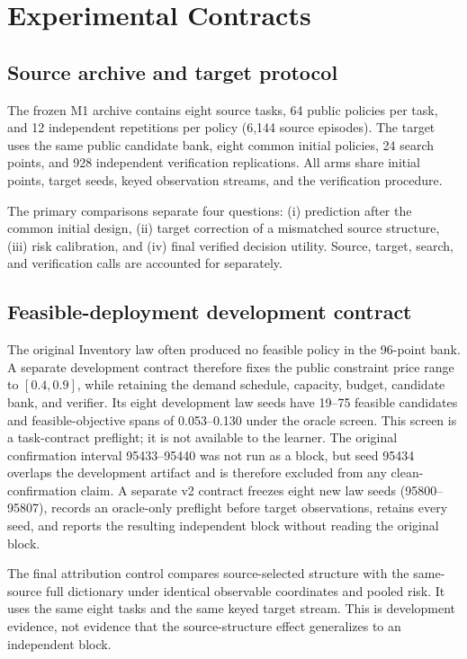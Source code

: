 \section{Experimental Contracts}\label{sec:mp_experiments}

\subsection{Source archive and target protocol}

The frozen M1 archive contains eight source tasks, 64 public policies per
task, and 12 independent repetitions per policy (6,144 source episodes).  The
target uses the same public candidate bank, eight common initial policies, 24
search points, and 928 independent verification replications.  All arms share
initial points, target seeds, keyed observation streams, and the verification
procedure.

The primary comparisons separate four questions: (i) prediction after the
common initial design, (ii) target correction of a mismatched source structure,
(iii) risk calibration, and (iv) final verified decision utility.  Source,
target, search, and verification calls are accounted for separately.

\subsection{Feasible-deployment development contract}

The original Inventory law often produced no feasible policy in the 96-point
bank.  A separate development contract therefore fixes the public constraint
price range to $[0.4,0.9]$, while retaining the demand schedule, capacity,
budget, candidate bank, and verifier.  Its eight development law seeds have
19--75 feasible candidates and feasible-objective spans of 0.053--0.130 under
the oracle screen.  This screen is a task-contract preflight; it is not
available to the learner.  The original confirmation interval 95433--95440
was not run as a block, but seed 95434 overlaps the development artifact and
is therefore excluded from any clean-confirmation claim.  A separate v2
contract freezes eight new law seeds (95800--95807),
records an oracle-only preflight before target observations, retains every
seed, and reports the resulting independent block without reading the
original block.

The final attribution control compares source-selected structure with the
same-source full dictionary under identical observable coordinates and pooled
risk.  It uses the same eight tasks and the same keyed target stream.  This is
development evidence, not evidence that the source-structure effect
generalizes to an independent block.

